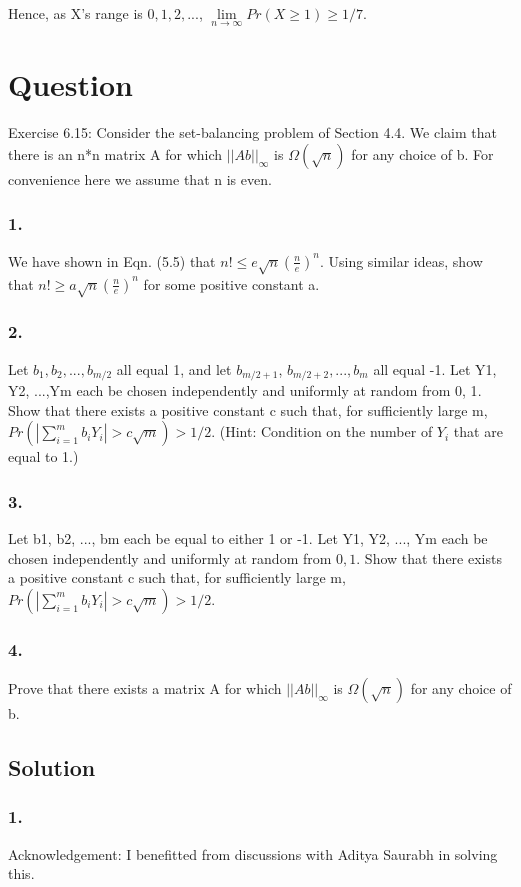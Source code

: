 \documentclass[10pt]{article}
\begin{document}
Hence, as X's range is $ {0,1,2,...}$, $\lim \limits_{n \to \infty } Pr(X \geq 1)\geq 1/7$.

\section{Question}
Exercise 6.15: Consider the set-balancing problem of Section 4.4. We claim that there is an n*n matrix A for which $||Ab||_{\infty}$ is $\Omega(\sqrt{n})$ for any choice of b. For convenience here we assume that n is even.

\subsubsection{1.} We have shown in Eqn. (5.5) that $n! \leq e \sqrt{n}(\frac{n}{e})^{n}$. Using similar ideas, show that $n! \geq a \sqrt{n}(\frac{n}{e})^{n}$ for some positive constant a.
\subsubsection{2.} Let $b_{1}, b_{2}, ..., b_{m/2}$ all equal 1, and let $b_{m/2+1}$, $b_{m/2+2}, ..., b_{m}$ all equal -1. Let Y1, Y2, ...,Ym each be chosen independently and uniformly at random from {0, 1}. Show that there exists a positive constant c such that, for sufficiently large m,
$Pr(|\sum_{i=1}^{m}b_{i}Y_{i}|>c\sqrt{m})>1/2$. (Hint: Condition on the number of $Y_{i}$ that are equal to 1.)
\subsubsection{3.} Let b1, b2, ..., bm each be equal to either 1 or -1. Let Y1, Y2, ..., Ym each be chosen independently and uniformly at random from ${0, 1}$. Show that there exists a positive constant c such that, for sufficiently large m, $Pr(|\sum_{i=1}^{m}b_{i}Y_{i}|>c\sqrt{m})>1/2$.
\subsubsection{4.} Prove that there exists a matrix A for which $||Ab||_{\infty}$ is $\Omega(\sqrt{n})$ for any choice of b.

\subsection{Solution}

\subsubsection{1.}
Acknowledgement: I benefitted from discussions with Aditya Saurabh in solving this.
\end{document}
